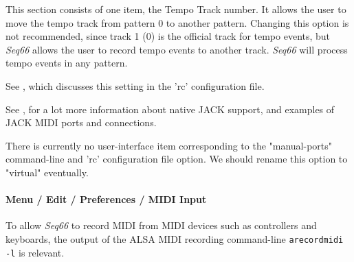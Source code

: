   This section consists of one item, the Tempo Track number.
   It allows the user to move the tempo track from pattern 0 to
   another pattern.  Changing this option is not recommended, since track 1 (0)
   is the official track for tempo events, but \textsl{Seq66} allows the
   user to record tempo events to another track.  \textsl{Seq66} will
   process tempo events in any pattern.


   See , which discusses this
   setting in the 'rc' configuration file.


   See ,
   for a lot more information about native JACK support, and examples of JACK
   MIDI ports and connections.

   There is currently no user-interface item corresponding to the "manual-ports"
   command-line and 'rc' configuration file option.
   We should rename this option to "virtual" eventually.

\paragraph{Menu / Edit / Preferences / MIDI Input}
\label{paragraph:seq66_menu_edit_preferences_midi_input}

   To allow \textsl{Seq66} to record MIDI from MIDI devices such as
   controllers and keyboards, the output of the ALSA MIDI recording
   command-line \texttt{arecordmidi -l} is relevant.


